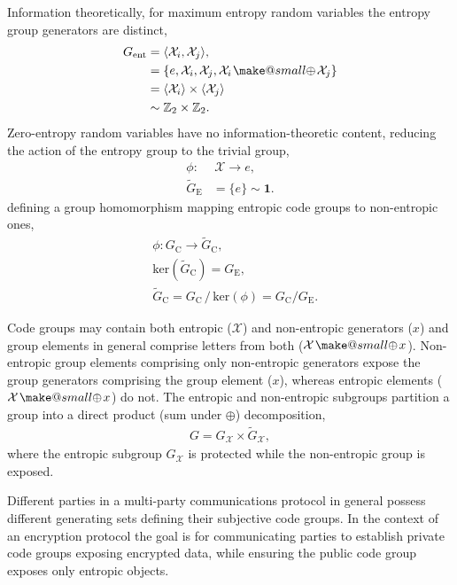 \documentclass[twocolumn, aps, amsmath, amssymb, nofootinbib, superscriptaddress, longbibliography, doublefloatfix, table-of-contents, eqsecnum, rmp]{revtex4-2}
\makeatletter
\newcommand{\soplus}{{{\hspace{1pt}}{\mathbin{\mathpalette\make@small{\mathbin\oplus}}}}{\hspace{1pt}}}
\newcommand{\make@small}[2]{%
  \vcenter{\hbox{%
    \scalebox{0.6}{$\m@th#1#2$}%
  }}%
}
\makeatother
\begin{document}
Information theoretically, for maximum entropy random variables the entropy group generators are distinct,
\begin{align}
	G_\mathrm{ent} &= \langle \mathcal{X}_i,\mathcal{X}_j\rangle,\nonumber\\
	&= \{e,\mathcal{X}_i,\mathcal{X}_j, \mathcal{X}_i\soplus \mathcal{X}_j\} \nonumber\\
	&= \langle \mathcal{X}_i\rangle \times \langle \mathcal{X}_j\rangle \nonumber\\
	&\sim \mathbb{Z}_2 \times \mathbb{Z}_2.
\end{align}
Zero-entropy random variables have no information-theoretic content, reducing the action of the entropy group to the trivial group,
\begin{align}
	\phi:&\, \mathcal{X} \to e,\nonumber\\
	{\tilde{G}}_\mathrm{E} &= \{e\} \sim \mathbf{1}.
\end{align}
defining a group homomorphism mapping entropic code groups to non-entropic ones,
\begin{align}
	&\phi: G_\mathrm{C} \to {\tilde G}_\mathrm{C},\nonumber\\
	&\mathrm{ker}({\tilde G}_\mathrm{C}) = G_\mathrm{E},\nonumber\\
	&{\tilde G}_\mathrm{C} = G_\mathrm{C} \,/\, \mathrm{ker}(\phi) = G_\mathrm{C} / G_\mathrm{E}.
\end{align}

Code groups may contain both entropic ($\mathcal{X}$) and non-entropic generators ($x$) and group elements in general comprise letters from both ($\mathcal{X}\soplus x$). Non-entropic group elements comprising only non-entropic generators expose the group generators comprising the group element ($x$), whereas entropic elements ($\mathcal{X}\soplus x$) do not. The entropic and non-entropic subgroups partition a group into a direct product (sum under $\oplus$) decomposition,
\begin{align}
	G = G_\mathcal{X} \times \tilde{G}_\mathcal{X},	
\end{align}
where the entropic subgroup $G_\mathcal{X}$ is protected while the non-entropic group is exposed.

Different parties in a multi-party communications protocol in general possess different generating sets defining their subjective code groups. In the context of an encryption protocol the goal is for communicating parties to establish private code groups exposing encrypted data, while ensuring the public code group exposes only entropic objects.
\end{document}
